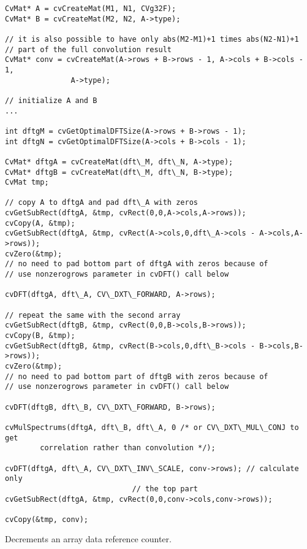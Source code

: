 \begin{lstlisting}
CvMat* A = cvCreateMat(M1, N1, CVg32F);
CvMat* B = cvCreateMat(M2, N2, A->type);

// it is also possible to have only abs(M2-M1)+1 times abs(N2-N1)+1
// part of the full convolution result
CvMat* conv = cvCreateMat(A->rows + B->rows - 1, A->cols + B->cols - 1, 
			   A->type);

// initialize A and B
...

int dftgM = cvGetOptimalDFTSize(A->rows + B->rows - 1);
int dftgN = cvGetOptimalDFTSize(A->cols + B->cols - 1);

CvMat* dftgA = cvCreateMat(dft\_M, dft\_N, A->type);
CvMat* dftgB = cvCreateMat(dft\_M, dft\_N, B->type);
CvMat tmp;

// copy A to dftgA and pad dft\_A with zeros
cvGetSubRect(dftgA, &tmp, cvRect(0,0,A->cols,A->rows));
cvCopy(A, &tmp);
cvGetSubRect(dftgA, &tmp, cvRect(A->cols,0,dft\_A->cols - A->cols,A->rows));
cvZero(&tmp);
// no need to pad bottom part of dftgA with zeros because of
// use nonzerogrows parameter in cvDFT() call below

cvDFT(dftgA, dft\_A, CV\_DXT\_FORWARD, A->rows);

// repeat the same with the second array
cvGetSubRect(dftgB, &tmp, cvRect(0,0,B->cols,B->rows));
cvCopy(B, &tmp);
cvGetSubRect(dftgB, &tmp, cvRect(B->cols,0,dft\_B->cols - B->cols,B->rows));
cvZero(&tmp);
// no need to pad bottom part of dftgB with zeros because of
// use nonzerogrows parameter in cvDFT() call below

cvDFT(dftgB, dft\_B, CV\_DXT\_FORWARD, B->rows);

cvMulSpectrums(dftgA, dft\_B, dft\_A, 0 /* or CV\_DXT\_MUL\_CONJ to get 
		correlation rather than convolution */);

cvDFT(dftgA, dft\_A, CV\_DXT\_INV\_SCALE, conv->rows); // calculate only 
							 // the top part
cvGetSubRect(dftgA, &tmp, cvRect(0,0,conv->cols,conv->rows));

cvCopy(&tmp, conv);
\end{lstlisting}

\ifC

Decrements an array data reference counter.


\begin{description}
\end{description}

